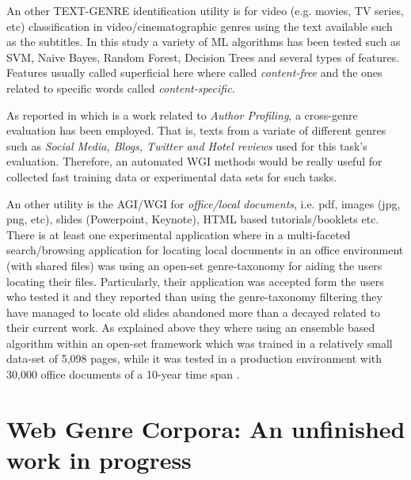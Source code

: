 An other TEXT-GENRE identification utility is for video (e.g. movies, TV series, etc) classification in video/cinematographic genres using the text available such as the subtitles. In this study a variety of ML algorithms has been tested such as SVM, Naive Bayes, Random Forest, Decision Trees and several types of features. Features usually called superficial here where called \textit{content-free} and the ones related to specific words called \textit{content-specific}\parencite{lee2017text}.

As reported in \parencite{rangel2016overview} which is a work related to \textit{Author Profiling}, a cross-genre evaluation has been employed. That is, texts from a variate of different genres such as \textit{Social Media, Blogs, Twitter and Hotel reviews} used for this task's evaluation. Therefore, an automated WGI methods would be really useful for collected fast training data or experimental data sets for such tasks.

An other utility is the AGI/WGI for \textit{office/local documents}, i.e. pdf, images (jpg, png, etc), slides (Powerpoint, Keynote), HTML based tutorials/booklets etc. There is at least one experimental application where in a multi-faceted search/browsing application for locating local documents in an office environment (with shared files) was using an open-set  genre-taxonomy for aiding the users locating their files. Particularly, their application was accepted form the users who tested it and they reported than using the genre-taxonomy filtering they have managed to locate old slides abandoned more than a decayed related to their current work. As explained above they where using an ensemble based algorithm within an open-set framework which was trained in a relatively small data-set of 5,098 pages, while it was tested in a production environment with 30,000 office documents of a 10-year time span \parencite{chen2012genre}. 


\section{Web Genre Corpora: An unfinished work in progress}\label{chap:relevant_work:sec:intro}


